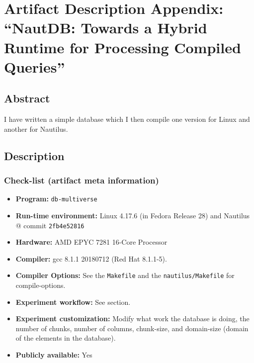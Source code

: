 \documentclass{IEEEtran}
\begin{document}

\appendices

\section{Artifact Description Appendix: ``NautDB: Towards a Hybrid Runtime for Processing Compiled Queries''}

\subsection{Abstract}

I have written a simple database which I then compile one version for Linux and another for Nautilus.

\subsection{Description}

\subsubsection{Check-list (artifact meta information)}

{\small
  \begin{itemize}
  \item {\bf Program:} \verb+db-multiverse+
  \item {\bf Run-time environment:} Linux 4.17.6 (in Fedora Release 28) and Nautilus @ commit \texttt{2fb4e52816}
  \item {\bf Hardware:} AMD EPYC 7281 16-Core Processor
  \item {\bf Compiler:} gcc 8.1.1 20180712 (Red Hat 8.1.1-5).
  \item {\bf Compiler Options:} See the \texttt{Makefile} and the \texttt{nautilus/Makefile} for compile-options.
  \item {\bf Experiment workflow:} See section.
  \item {\bf Experiment customization:} Modify what work the database is doing, the number of chunks, number of columns, chunk-size, and domain-size (domain of the elements in the database).
  \item {\bf Publicly available:} Yes
  \end{itemize}
}
\end{document}
